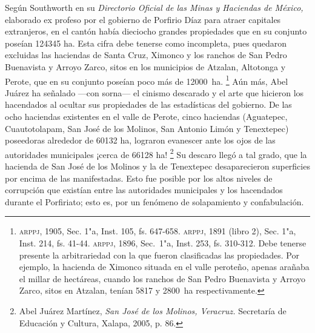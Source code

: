 \documentclass[14pt,twoside,final]{extbook} %
\let\oldfootnote\footnote
\renewcommand\footnote[1]{%
\oldfootnote{\hspace{1mm}#1}}
\begin{document}
Según Southworth en su \emph{Directorio Oficial de las Minas y Haciendas de México,} elaborado ex profeso por el gobierno de Porfirio Díaz para atraer capitales extranjeros, en el cantón había dieciocho grandes propiedades que en su conjunto poseían 124345 ha. Esta cifra debe tenerse como incompleta, pues quedaron excluidas las haciendas de Santa Cruz, Ximonco y los ranchos de San Pedro Buenavista y Arroyo Zarco, sitos en los municipios de Atzalan, Altotonga y Perote, que en su conjunto poseían poco más de 12000~ha.\footnote{\textsc{arppj}, 1905, Sec. 1"a, Inst. 105, fs. 647-658. \textsc{arppj}, 1891 (libro 2), Sec. 1"a, Inst. 214, fs. 41-44. \textsc{arppj}, 1896, Sec.~1"a, Inst. 253, fs. 310-312. Debe tenerse presente la arbitrariedad con la que fueron clasificadas las propiedades. Por ejemplo, la hacienda de Ximonco situada en el valle peroteño, apenas arañaba el millar de hectáreas, cuando los ranchos de San Pedro Buenavista y Arroyo Zarco, sitos en Atzalan, tenían 5817 y 2800~ha respectivamente.} Aún más, Abel Juárez ha señalado ---con sorna--- el cinismo descarado y el arte que hicieron los hacendados al ocultar sus propiedades de las estadísticas del gobierno. De las ocho haciendas existentes en el valle de Perote, cinco haciendas (Aguatepec, Cuautotolapam, San José de los Molinos, San Antonio Limón y Tenextepec) poseedoras alrededor de 60132 ha, lograron evanescer ante los ojos de las autoridades municipales ¡cerca de 66128 ha!\footnote{Abel Juárez Martínez, \emph{San José de los Molinos, Veracruz.} Secretaría de Educación y Cultura, Xalapa, 2005, p. 86.} Su descaro llegó a tal grado, que la hacienda de San José de los Molinos y la de Tenextepec desaparecieron superficies por encima de las manifestadas. Esto fue posible por los altos niveles de corrupción que existían entre las autoridades municipales y los hacendados durante el Porfiriato; esto es, por un fenómeno de solapamiento y confabulación.
\end{document}
